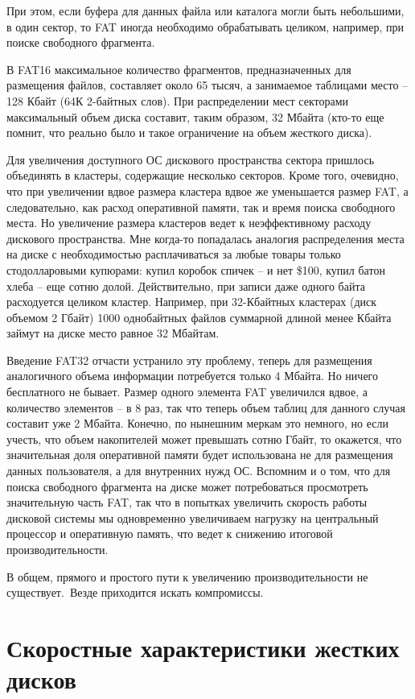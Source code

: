 \documentclass[bachelor, och, referat]{SCWorks}
\begin{document}
При этом, если буфера для данных файла или каталога могли быть небольшими, в один сектор, то FAT иногда необходимо обрабатывать целиком, например, при поиске свободного фрагмента.

В FAT16 максимальное количество фрагментов, предназначенных для размещения файлов, составляет около 65 тысяч, а занимаемое таблицами место -- 128 Кбайт (64К 2-байтных слов). При распределении мест секторами максимальный объем диска составит, таким образом, 32 Мбайта (кто-то еще помнит, что реально было и такое ограничение на объем жесткого диска).

Для увеличения доступного ОС дискового пространства сектора пришлось объединять 
в кластеры, содержащие несколько секторов. Кроме того, очевидно, что при 
увеличении вдвое размера кластера вдвое же уменьшается размер FAT, а 
следовательно, как расход оперативной памяти, так и время поиска свободного 
места. Но увеличение размера кластеров ведет к неэффективному расходу дискового 
пространства. Мне когда-то попадалась аналогия распределения места на диске с 
необходимостью расплачиваться за любые товары только стодолларовыми купюрами: 
купил коробок спичек – и нет \$100, купил батон хлеба – еще сотню долой. 
Действительно, при записи даже одного байта расходуется целиком кластер. 
Например, при 32-Кбайтных кластерах (диск объемом 2 Гбайт) 1000 однобайтных 
файлов суммарной длиной менее Кбайта займут на диске место равное 32 Мбайтам.

Введение FAT32 отчасти устранило эту проблему, теперь для размещения аналогичного объема информации потребуется только 4 Мбайта. Но ничего бесплатного не бывает. Размер одного элемента FAT увеличился вдвое, а количество элементов -- в 8 раз, так что теперь объем таблиц для данного случая составит уже 2 Мбайта. Конечно, по нынешним меркам это немного, но если учесть, что объем накопителей может превышать сотню Гбайт, то окажется, что значительная доля оперативной памяти будет использована не для размещения данных пользователя, а для внутренних нужд ОС. Вспомним и о том, что для поиска свободного фрагмента на диске может потребоваться просмотреть значительную часть FAT, так что в попытках увеличить скорость работы дисковой системы мы одновременно увеличиваем нагрузку на центральный процессор и оперативную память, что ведет к снижению итоговой производительности.

В общем, прямого и простого пути к увеличению производительности не существует.\
Везде приходится искать компромиссы.


\section{Скоростные характеристики жестких дисков}
\end{document}
